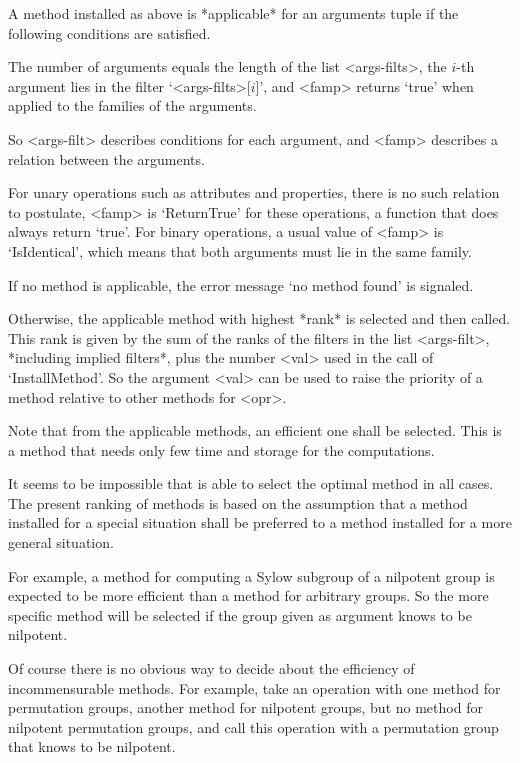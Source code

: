 
A method installed as above is *applicable* for an arguments tuple
if the following conditions are satisfied.

The number of arguments equals the length of the list <args-filts>,
the $i$-th argument lies in the filter `<args-filts>[$i$]',
and <famp> returns `true' when applied to the families of the arguments.

So <args-filt> describes conditions for each argument,
and <famp> describes a relation between the arguments.

For unary operations such as attributes and properties,
there is no such relation to postulate,
<famp> is `ReturnTrue' for these operations,
a function that does always return `true'.
For binary operations, a usual value of <famp> is `IsIdentical',
which means that both arguments must lie in the same family.

If no method is applicable,
the error message `no method found' is signaled.

Otherwise, the applicable method with highest *rank* is selected and then
called.
This rank is given by the sum of the ranks of the filters in the list
<args-filt>,
*including implied filters*,
plus the number <val> used in the call of `InstallMethod'.
So the argument <val> can be used to raise the priority of a method
relative to other methods for <opr>.

Note that from the applicable methods,
an efficient one shall be selected.
This is a method that needs only few time and storage for the
computations.

It seems to be impossible that {\GAP} is able to select the optimal
method in all cases.
The present ranking of methods is based on the assumption
that a method installed for a special situation shall be preferred
to a method installed for a more general situation.

For example, a method for computing a Sylow subgroup of a nilpotent
group is expected to be more efficient than a method for arbitrary
groups.
So the more specific method will be selected if the group given as
argument knows to be nilpotent.

Of course there is no obvious way to decide about the efficiency of
incommensurable methods.
For example, take an operation with one method for permutation groups,
another method for nilpotent groups,
but no method for nilpotent permutation groups,
and call this operation with a permutation group that knows to be
nilpotent.

